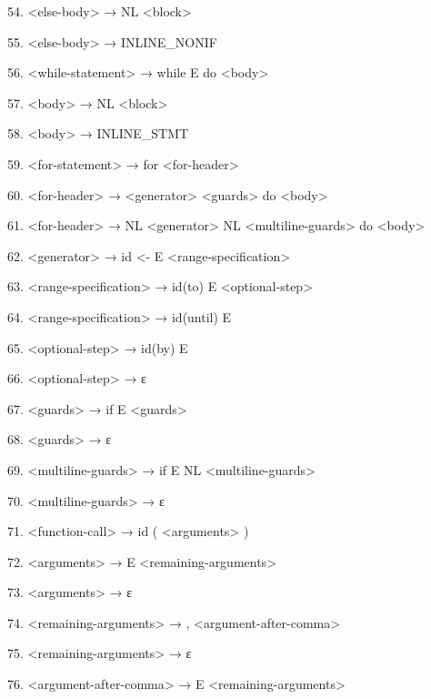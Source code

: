 \documentclass{article}
\begin{document}
54. \textless else-body\textgreater{} → NL \textless block\textgreater{}

55. \textless else-body\textgreater{} → INLINE\_NONIF

56. \textless while-statement\textgreater{} → while E do \textless body\textgreater{}

57. \textless body\textgreater{} → NL \textless block\textgreater{}

58. \textless body\textgreater{} → INLINE\_STMT

59. \textless for-statement\textgreater{} → for \textless for-header\textgreater{}

60. \textless for-header\textgreater{} → \textless generator\textgreater{} \textless guards\textgreater{} do \textless body\textgreater{}

61. \textless for-header\textgreater{} → NL \textless generator\textgreater{} NL \textless multiline-guards\textgreater{} do \textless body\textgreater{}

62. \textless generator\textgreater{} → id \textless- E \textless range-specification\textgreater{}

63. \textless range-specification\textgreater{} → id(to) E \textless optional-step\textgreater{}

64. \textless range-specification\textgreater{} → id(until) E

65. \textless optional-step\textgreater{} → id(by) E

66. \textless optional-step\textgreater{} → ε

67. \textless guards\textgreater{} → if E \textless guards\textgreater{}

68. \textless guards\textgreater{} → ε

69. \textless multiline-guards\textgreater{} → if E NL \textless multiline-guards\textgreater{}

70. \textless multiline-guards\textgreater{} → ε

71. \textless function-call\textgreater{} → id ( \textless arguments\textgreater{} )

72. \textless arguments\textgreater{} → E \textless remaining-arguments\textgreater{}

73. \textless arguments\textgreater{} → ε

74. \textless remaining-arguments\textgreater{} → , \textless argument-after-comma\textgreater{}

75. \textless remaining-arguments\textgreater{} → ε

76. \textless argument-after-comma\textgreater{} → E \textless remaining-arguments\textgreater{}
\end{document}
